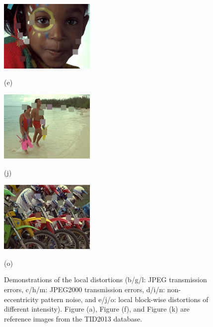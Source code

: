 \begin{figure}[!]
		\begin{minipage}[t]{.32\linewidth}
			\includegraphics[width=1.8in]{TID/i15_15_1.jpg}
			\centerline{(e)}
		\end{minipage}
		\begin{minipage}[t]{.32\linewidth}
			\includegraphics[width=1.8in]{TID/i12_15_1.jpg}
			\centerline{(j)}
		\end{minipage}
		\begin{minipage}[t]{.32\linewidth}
			\includegraphics[width=1.8in]{TID/i05_15_1.jpg}
			\centerline{(o)}
		\end{minipage}
		
		\caption{Demonstrations of the local distortions (b/g/l: JPEG transmission errors, c/h/m: JPEG2000 transmission errors, d/i/n: non-eccentricity pattern noise, and e/j/o: local block-wise distortions of different intensity). Figure (a), Figure (f), and Figure (k) are reference images from the TID2013 database.}
		\label{TID2013-Distortion}
	\end{figure}
